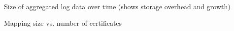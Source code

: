 \begin{compactitem}
\item Size of aggregated log data over time (shows storage overhead and growth)
\item Mapping size vs. number of certificates
\end{compactitem}







